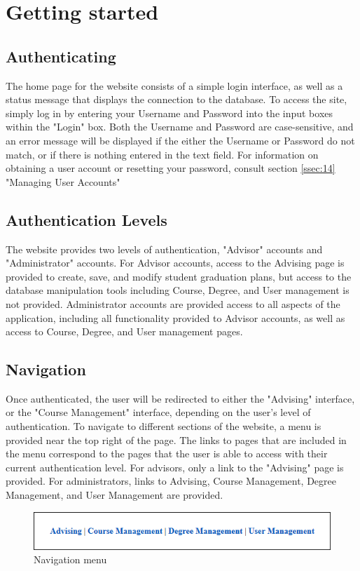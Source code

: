 \documentclass[]{article}
\begin{document}
\pagebreak\section{Getting started}
	\subsection{Authenticating}\label{ssec:4}
	
		The home page for the website consists of a simple login interface, as well as a status message that displays the connection to the database. To access the site, simply log in by entering your Username and Password into the input boxes within the "Login" box. Both the Username and Password are case-sensitive, and an error message will be displayed if the either the Username or Password do not match, or if there is nothing entered in the text field. For information on obtaining a user account or resetting your password, consult section \ref{ssec:14} "Managing User Accounts"
	\subsection{Authentication Levels}\label{ssec:16}
	
		The website provides two levels of authentication, "Advisor" accounts and "Administrator" accounts. For Advisor accounts, access to the Advising page is provided to create, save, and modify student graduation plans, but access to the database manipulation tools including Course, Degree, and User management is not provided. Administrator accounts are provided access to all aspects of the application, including all functionality provided to Advisor accounts, as well as access to Course, Degree, and User management pages.
	\subsection{Navigation}\label{ssec:15}
	
		Once authenticated, the user will be redirected to either the "Advising" interface, or the "Course Management" interface, depending on the user's level of authentication. To navigate to different sections of the website, a menu is provided near the top right of the page. The links to pages that are included in the menu correspond to the pages that the user is able to access with their current authentication level. For advisors, only a link to the "Advising" page is provided. For administrators, links to Advising, Course Management, Degree Management, and User Management are provided.\\
		\begin{figure}[h]
			\caption{Navigation menu}
			\centering
			\includegraphics[width=\textwidth]{navigation.PNG}
		\end{figure}
\end{document}
